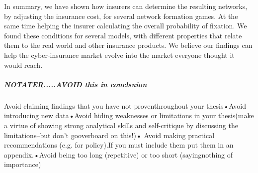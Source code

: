 In summary, we have shown how insurers can determine the resulting networks, by adjusting the insurance cost, for several network formation games. At the same time helping the insurer calculating the overall probability of fixation.
We found these conditions for several models, with different properties that relate them to the real world and other insurance products. We believe our findings can help the cyber-insurance market evolve into the market everyone thought it would reach.


\subparagraph{NOTATER.....AVOID this in conclsuion}
Avoid claiming findings that you have not proventhroughout your thesis•Avoid introducing new data•Avoid hiding weaknesses or limitations in your thesis(make a virtue of showing strong analytical skills and self-critique by discussing the limitations--but don’t gooverboard on this!)• Avoid making practical recommendations (e.g. for policy).If you must include them put them in an appendix.•Avoid being too long (repetitive) or too short (sayingnothing of importance)
